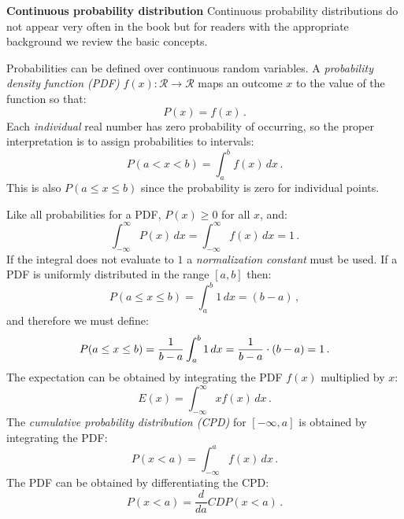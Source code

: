 \textbf{\large Continuous probability distribution}\label{p.continuous}
Continuous probability distributions do not appear very often in the book but for readers with the appropriate background we review the basic concepts.

Probabilities can be defined over continuous random variables. A  \emph{probability density function (PDF)} $f(x): \mathcal{R}\rightarrow \mathcal{R}$ maps an outcome $x$ to the value of the function so that:
\[
P(x) = f(x)\,.
\]
Each \emph{individual} real number has zero probability of occurring, so the proper interpretation is to assign probabilities to intervals:
\[
P(a<x<b) = \int_{a}^{b} f(x)\, dx\,.
\]
This is also $P(a\leq x\leq b)$ since the probability is zero for individual points.

Like all probabilities for a PDF, $P(x)\geq 0$ for all $x$, and:
\[
\int_{-\infty}^{\infty} P(x)\, dx=\int_{-\infty}^{\infty} f(x)\, dx=1\,.
\]
If the integral does not evaluate to $1$ a \emph{normalization constant} \label{p.normal} must be used. If a PDF is uniformly distributed in the range $[a,b]$ then:
\[
P(a\leq x \leq b)=\int_{a}^{b} 1\, dx=(b-a)\,,
\]
and therefore we must define:
\[
P(a\leq x \leq b)=\displaystyle\frac{1}{b-a}\int_{a}^{b} 1\, dx=\displaystyle\frac{1}{b-a}\cdot (b-a)=1\,.
\]
The expectation can be obtained by integrating the PDF $f(x)$ multiplied by $x$:
\[
E(x)=\int_{-\infty}^{\infty} xf(x)\, dx\,.
\]
The \emph{cumulative probability distribution (CPD)} for $[-\infty,a]$ is obtained by integrating the PDF:
\[
P(x<a) = \int_{-\infty}^{a} f(x)\, dx\,.
\]
The PDF can be obtained by differentiating the CPD:
\[
P(x<a)= \frac{d}{da}\mathit{CDP}(x<a)\,.
\]

